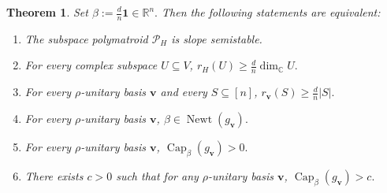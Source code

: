 \documentclass[oneside,english,letterpaper]{amsart}
\numberwithin{equation}{section}
\theoremstyle{plain}
\newtheorem{thm}{Theorem}[section]
\theoremstyle{definition}
\theoremstyle{remark}
\def\one{\mathbf{1}}
\def\Newt{\operatorname{Newt}}
\def\Capacity{\operatorname{Cap}}
\begin{document}
\begin{thm}
\label{thm:capacity-subspace-slope-stability}
Set
\(
\beta:=\frac{d}{n}\one\in\mathbb R^n.\) Then the following
statements are equivalent:
\begin{enumerate}[label=\textnormal{(\arabic*)}]
\item\label{enu:subspace-slope-1} The subspace polymatroid \(\mathcal P_H\) is slope semistable.
\item\label{enu:subspace-slope-2} For every complex subspace \(U\subseteq V\),
\(
r_H(U)\geq\frac{d}{n}\dim_{\mathbb C}U.
\)
\item\label{enu:subspace-slope-3} For every \(\rho\)-unitary basis \(\mathbf v\) and every
\(S\subseteq[n]\),
\(
r_{\mathbf v}(S)\geq\frac{d}{n}|S|.
\)
\item\label{enu:subspace-slope-4} For every \(\rho\)-unitary basis \(\mathbf v\),
\(
\beta\in\Newt(g_{\mathbf v}).
\)
\item\label{enu:subspace-slope-5} For every \(\rho\)-unitary basis \(\mathbf v\),
\(
\Capacity_\beta(g_{\mathbf v})>0.
\)
\item\label{enu:subspace-slope-6} There exists  $c>0$ such that for any \(\rho\)-unitary basis \(\mathbf v\),
\(
\Capacity_\beta(g_{\mathbf v})>c.
\)
\end{enumerate}
\end{thm}
\end{document}
